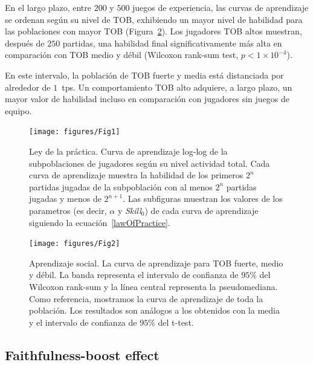 \documentclass[a4paper,11pt]{book}
\theoremstyle{definition}
\begin{document}

En el largo plazo, entre $200$ y $500$ juegos de experiencia, las curvas de aprendizaje se ordenan según su nivel de TOB, exhibiendo un mayor nivel de habilidad para las poblaciones con mayor TOB (Figura~\ref{learningskill_team_hasta4team}).
%
Los jugadores TOB altos muestran, después de $250$ partidas, una habilidad final significativamente más alta en comparación con TOB medio y débil (Wilcoxon rank-sum test, $p<1 \times10^{-4}$).


En este intervalo, la población de TOB fuerte y media está distanciada por alrededor de $1$~tps.
%
Un comportamiento TOB alto adquiere, a largo plazo, un mayor valor de habilidad incluso en comparación con jugadores sin juegos de equipo.

\begin{figure}[ht!]
\centering
\texttt{[image: figures/Fig1]}
\caption{
Ley de la práctica.
%
Curva de aprendizaje log-log de la subpoblaciones de jugadores según su nivel actividad total.
%
Cada curva de aprendizaje muestra la habilidad de los primeros $2^n$ partidas jugadas de la subpoblación con al menos $2^n$ partidas jugadas y menos de $2^{n+1}$.
%
Las subfiguras muestran los valores de los parametros (es decir, $\alpha$ y \emph{Skill}$_0$) de cada curva de aprendizaje siguiendo la ecuación~\ref{lawOfPractice}.
}
\label{learningskill_curve}
\end{figure}

\begin{figure}[ht!]
\centering
\texttt{[image: figures/Fig2]}
\caption{
Aprendizaje social.
%
La curva de aprendizaje para TOB fuerte, medio y débil.
%
La banda representa el intervalo de confianza de $95\%$ del Wilcoxon rank-sum y la línea central representa la pseudomediana.
%
Como referencia, mostramos la curva de aprendizaje de toda la población.
%
Los resultados son análogos a los obtenidos con la media y el intervalo de confianza de $95\%$ del t-test.
}
\label{learningskill_team_hasta4team}
\end{figure}


\subsection{Faithfulness-boost effect}
\end{document}
